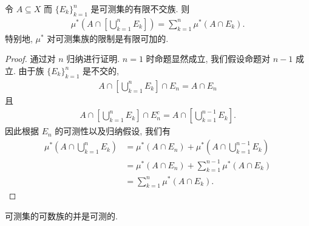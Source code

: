 \documentclass[../../main.tex]{subfiles}
\begin{document}
\begin{proposition}\label{proposition:ch17-finite-additivity}
令 $A\subseteq X$ 而 $\{E_{k}\}_{k=1}^{n}$ 是可测集的有限不交族. 则
\begin{align*}
\mu^*\left(A\cap\left[\bigcup_{k=1}^{n}E_{k}\right]\right)=\sum_{k=1}^{n}\mu^*(A\cap E_{k}).
\end{align*}
特别地, $\mu^*$ 对可测集族的限制是有限可加的.
\end{proposition}

\begin{proof}
通过对 $n$ 归纳进行证明. $n=1$ 时命题显然成立, 我们假设命题对 $n-1$ 成立. 由于族 $\{E_{k}\}_{k=1}^{n}$ 是不交的,
\begin{align*}
A\cap\left[\bigcup_{k=1}^{n}E_{k}\right]\cap E_{n}=A\cap E_{n}
\end{align*}
且
\begin{align*}
A\cap\left[\bigcup_{k=1}^{n}E_{k}\right]\cap E_{n}^{c}=A\cap\left[\bigcup_{k=1}^{n-1}E_{k}\right].
\end{align*}
因此根据 $E_{n}$ 的可测性以及归纳假设, 我们有
\begin{align*}
\mu^*\left(A\cap\bigcup_{k=1}^{n}E_{k}\right)&=\mu^*(A\cap E_{n})+\mu^*\left(A\cap\bigcup_{k=1}^{n-1}E_{k}\right)\\
&=\mu^*(A\cap E_{n})+\sum_{k=1}^{n-1}\mu^*(A\cap E_{k})\\
&=\sum_{k=1}^{n}\mu^*(A\cap E_{k}).
\end{align*}
\end{proof}

\begin{proposition}\label{proposition:ch17-countable-union-measurable}
可测集的可数族的并是可测的.
\end{proposition}
\end{document}
